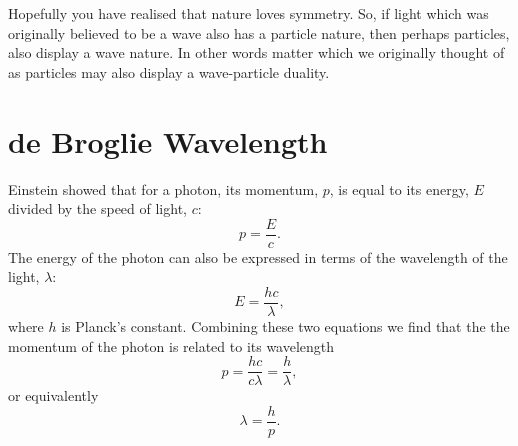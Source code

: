Hopefully you have realised that nature loves symmetry. So, if light which was originally believed to be a wave also has a particle nature, then perhaps particles, also display a wave nature. In other words matter which we originally thought of as particles may also display a wave-particle duality.

\section{de Broglie Wavelength}

Einstein showed that for a photon, its momentum, $p$, is equal to its energy, $E$ divided by the speed of light, $c$:
$$p=\frac{E}{c}.$$
The energy of the photon can also be expressed in terms of the wavelength of the light, $\lambda$:
$$E=\frac{hc}{\lambda},$$
where $h$ is Planck's constant. Combining these two equations we find that the the momentum of the photon is related to its wavelength
$$p=\frac{hc}{c\lambda}=\frac{h}{\lambda},$$
or equivalently
$$\lambda=\frac{h}{p}.$$

